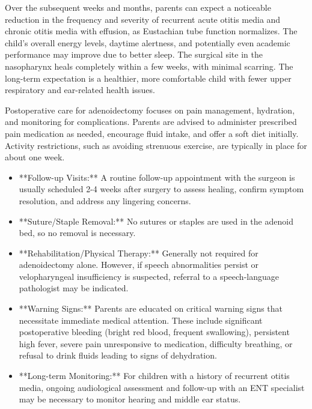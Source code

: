 Over the subsequent weeks and months, parents can expect a noticeable reduction in the frequency and severity of recurrent acute otitis media and chronic otitis media with effusion, as Eustachian tube function normalizes. The child's overall energy levels, daytime alertness, and potentially even academic performance may improve due to better sleep. The surgical site in the nasopharynx heals completely within a few weeks, with minimal scarring. The long-term expectation is a healthier, more comfortable child with fewer upper respiratory and ear-related health issues.

Postoperative care for adenoidectomy focuses on pain management, hydration, and monitoring for complications. Parents are advised to administer prescribed pain medication as needed, encourage fluid intake, and offer a soft diet initially. Activity restrictions, such as avoiding strenuous exercise, are typically in place for about one week.

\begin{itemize}
  \item **Follow-up Visits:** A routine follow-up appointment with the surgeon is usually scheduled 2-4 weeks after surgery to assess healing, confirm symptom resolution, and address any lingering concerns.
  \item **Suture/Staple Removal:** No sutures or staples are used in the adenoid bed, so no removal is necessary.
  \item **Rehabilitation/Physical Therapy:** Generally not required for adenoidectomy alone. However, if speech abnormalities persist or velopharyngeal insufficiency is suspected, referral to a speech-language pathologist may be indicated.
  \item **Warning Signs:** Parents are educated on critical warning signs that necessitate immediate medical attention. These include significant postoperative bleeding (bright red blood, frequent swallowing), persistent high fever, severe pain unresponsive to medication, difficulty breathing, or refusal to drink fluids leading to signs of dehydration.
\item **Long-term Monitoring:** For children with a history of recurrent otitis media, ongoing audiological assessment and follow-up with an ENT specialist may be necessary to monitor hearing and middle ear status.
\end{itemize}

